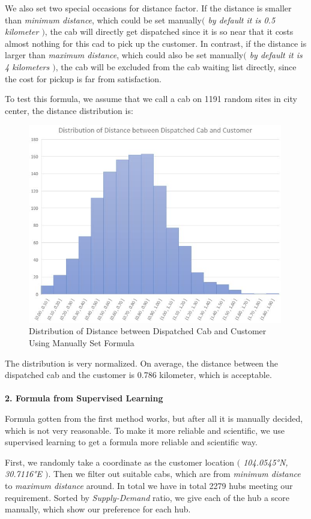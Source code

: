 \documentclass{article}
\begin{document}
\qquad We also set two special occasions for distance factor. If the distance is smaller than \emph{minimum distance}, which could be set manually\emph{$($ by default it is 0.5 kilometer $)$}, the cab will directly get dispatched since it is so near that it costs almost nothing for this cad to pick up the customer. In contrast, if the distance is larger than \emph{maximum distance}, which could also be set manually\emph{$($ by default it is 4 kilometers $)$}, the cab will be excluded from the cab waiting list directly, since the cost for pickup
is far from satisfaction.

\qquad To test this formula, we assume that we call a cab on 1191 random sites in city center, the distance distribution is:

\begin{figure}[htbp]
	\centering
	\includegraphics[width = 30em]{Distribution.JPG}
	\caption{Distribution of Distance between Dispatched Cab and Customer Using Manually Set Formula}
\end{figure}

\qquad The distribution is very normalized. On average, the distance between the dispatched cab and the customer is 0.786 kilometer, which is acceptable.
\\\\
\textbf{2. Formula from Supervised Learning}

\qquad Formula gotten from the first method works, but after all it is manually decided, which is not very reasonable. To make it more reliable and scientific, we use supervised learning to get a formula more reliable and scientific way.

\qquad First, we randomly take a coordinate as the customer location \emph{$($ \ang{104.0545;;}N, \ang{30.7116;;}E $)$}. Then we filter out suitable cabs, which are from \emph{minimum distance} to \emph{maximum distance} around. In total we have in total 2279 hubs meeting our requirement. Sorted by \emph{Supply-Demand} ratio, we give each of the hub a score manually, which show our preference for each hub.
\end{document}
